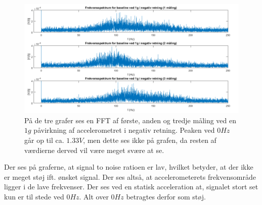 \begin{figure}[H]
	\centering
	\includegraphics[scale=0.5]{figures/cProblemloesning/Pilotforsoeg_FrekvensN.png}
	\caption{På de tre grafer ses en FFT af første, anden og tredje måling ved en $1g$ påvirkning af accelerometret i negativ retning. Peaken ved $0Hz$ går op til ca. $1.33V$, men dette ses ikke på grafen, da resten af værdierne derved vil være meget svære at se.}
	\label{Fig:Pilot_FFTN}
\end{figure}

\noindent Der ses på graferne, at signal to noise ratioen er lav, hvilket betyder, at der ikke er meget støj ift. ønsket signal. Der ses altså, at accelerometerets frekvensområde ligger i de lave frekvenser. Der ses ved en statisk acceleration at, signalet stort set kun er til stede ved $0Hz$. Alt over $0Hz$ betragtes derfor som støj. 

